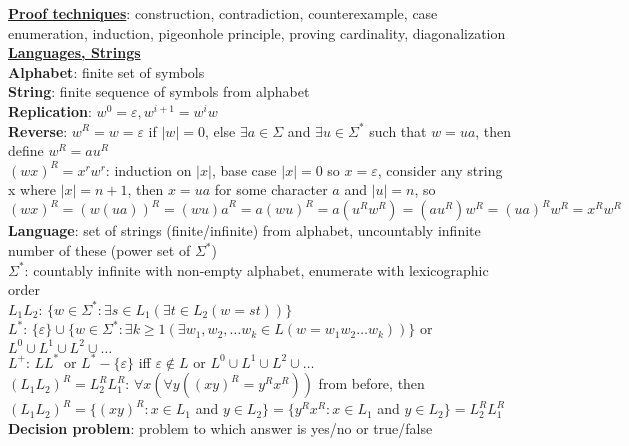 \documentclass[a4paper]{article}
\begin{document}
    \begin{multicols}{2}
        \scriptsize
        \noindent\underline{\textbf{Proof techniques}}: construction, contradiction, counterexample, case enumeration, induction, pigeonhole principle, proving cardinality, diagonalization\\
        \underline{\textbf{Languages, Strings}}\\
        \textbf{Alphabet}: finite set of symbols\\
        \textbf{String}: finite sequence of symbols from alphabet\\
        \textbf{Replication}: $w^0 = \varepsilon, w^{i+1} = w^i w$\\
        \textbf{Reverse}: $w^R = w = \varepsilon$ if $|w| = 0$, else $\exists a \in \Sigma$ and $\exists u \in \Sigma ^*$ such that $w = ua$, then define $w^R = {au}^R$\\
        \boldmath${(wx)}^R = x^r w^r$\unboldmath: induction on $|x|$, base case $|x| = 0$ so $x = \varepsilon$, consider any string x where $|x| = n+1$, then $x = ua$ for some character $a$ and $|u| = n$, so ${(wx)}^R = {(w(ua))}^R = {(wu)a}^R = a{(wu)}^R = a(u^R w^R) = (a u^R) w^R = {(ua)}^R w^R = x^R w^R$\\
        \textbf{Language}: set of strings (finite/infinite) from alphabet, uncountably infinite number of these (power set of $\Sigma ^*$)\\
        \boldmath$\Sigma ^*$\unboldmath: countably infinite with non-empty alphabet, enumerate with lexicographic order\\
        \boldmath$L_1 L_2$\unboldmath: $\{ w \in \Sigma ^* : \exists s \in L_1 (\exists t \in L_2 (w = st)) \}$\\
        \boldmath$L^*$\unboldmath: $\{ \varepsilon \} \cup \{ w \in \Sigma ^* : \exists k \geq 1 (\exists w_1, w_2, \ldots w_k \in L (w = w_1 w_2 \ldots w_k)) \}$ or $L^0 \cup L^1 \cup L^2 \cup \ldots$\\
        \boldmath$L^+$\unboldmath: $L L^*$ or $L^* - \{\varepsilon\}$ iff $\varepsilon \notin L$ or $L^0 \cup L^1 \cup L^2 \cup \ldots$\\
        \boldmath${(L_1 L_2)}^R = L_2^R L_1^R$\unboldmath: $\forall x (\forall y ({(xy)}^R = y^R x^R))$ from before, then ${(L_1 L_2)}^R = \{ {(xy)}^R : x \in L_1$ and $y \in L_2 \} = \{ y^R x^R : x \in L_1$ and $y \in L_2 \} = L_2^R L_1^R$\\
        \textbf{Decision problem}: problem to which answer is yes/no or true/false\\

\end{multicols}
\end{document}

